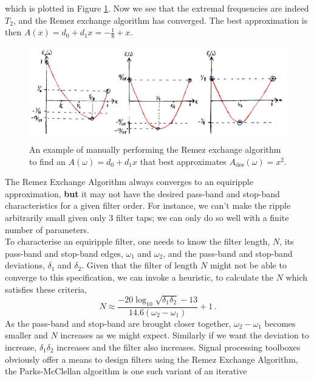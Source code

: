\begin{exmp}
  which is plotted in Figure \ref{fig::lecture_17_remez_iteration}. Now we see that
  the extremal frequencies
  are indeed $T_2$, and the Remez exchange algorithm has converged. The best
  approximation is then $A(x) = d_0 + d_1 x = - \frac{1}{8} + x$.
  \begin{figure}[!htb]
    \includegraphics[width=\textwidth]{images/lecture_17_remez_iteration.JPG}
    \caption{An example of manually performing the Remez exchange algorithm
      to find an $A(\omega) = d_0 + d_1 x$ that best approximates
      $A_\mathrm{des}(\omega) = x^2$.
    }
    \label{fig::lecture_17_remez_iteration}
  \end{figure}

\end{exmp}
%
The Remez Exchange Algorithm always converges to an equiripple approximation,
\textbf{but} it may not have the desired pass-band and stop-band characteristics for
a given filter order. For instance, we can't make the ripple arbitrarily small
given only 3 filter taps; we can only do so well with a finite number of
parameters.\\
%
To characterise an equiripple filter, one needs to know the filter length, $N$,
its pass-band and stop-band edges, $\omega_1$ and $\omega_2$, and the pass-band
and stop-band deviations, $\delta_1$ and $\delta_2$. Given that the filter of
length $N$ might not be able to converge to this specification, we can invoke a
heuristic, to calculate the $N$ which satisfies these criteria,
%
\begin{displaymath}
  N \approx \frac{-20 \log_10\sqrt{\delta_1\delta_2} - 13}{14.6(\omega_2 - \omega_1)} + 1 \,.
\end{displaymath}
%
As the pass-band and stop-band are brought closer together, $\omega_2 - \omega_1$
becomes smaller and $N$ increases as we might expect. Similarly if we want
the deviation to increase, $\delta_1\delta_2$ increases and the
filter also increases. Signal processing toolboxes obviously offer
a means to design filters using the Remez Exchange Algorithm,
the Parks-McClellan algorithm is one such variant of an iterative
